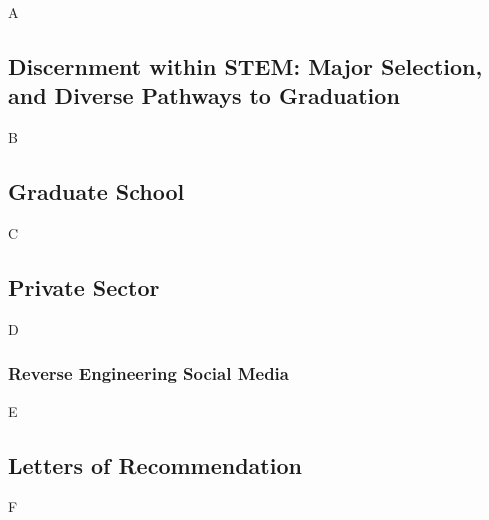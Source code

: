 \documentclass[../../../main.tex]{subfiles}
\begin{document}
A
\subsection{Discernment within STEM: Major Selection, and Diverse Pathways to Graduation}
B
\subsection{Graduate School}
C
\subsection{Private Sector}
D
\subsubsection{Reverse Engineering Social Media}
E
\subsection{Letters of Recommendation}
F
\end{document}
